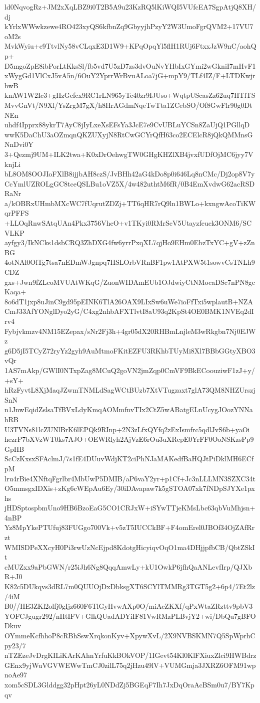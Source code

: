 ld0NqvogRz+JM2xXqLBZ9i0T2B5A9u23KzRQ5lKiWQI5VUfcEA7SgpAtjQ8XH/dj
kYrlxWWwkzewe4RO423xyQS6kfbnZq9GbyyjhPzyY2W3UmoFgrQVM2+17VU7oM2s
MvkWyiu+c9TtvlNy58vCLqxE3D1W9+KPqOpqYl5flH1RUj6FtxxJzW9nC/aohQp+
D5mgoZpE8ibPorLtKksSl/fb5vd7U5zD7zs3dvOuNvYHbIxGYmi2wGkniI7mHvF1
xWygGd1VlCxJ5vA5n/6OuY2YprrWrBvuALoa7jG+mpY9/TLf4IZ/F+LTDKwjrbwB
knAW1W2Ic3+gHzGcfcx9RC1rLN965yTc40zr9IJUso+WqtpUScasZz62uq7HTlTS
MvvGnVt/N9Xl/YsZrgM7gX/h8HrAGdmNqeTwTta1ZCebSO/Of8GwFlr90g0DtNEn
uhdf4Ipprx88ykrT7AyC8jIyLxeXsEFsYa3JcE7e9CvUBLuYCSn8ZaUjQ1PGllqD
wwK5DaChU3aOZmqnQKZUXyjN8RtCwGCYrQfH63co2ECElcR8jQkQMMnsGNnDvi0Y
3+Qezmj9UM+ILK2twa+K0xDrOehwgTW0GHgKHZlXB4jvxfUDfOjMC6jyy7VknjLi
bL8OM8OOJIoFXlB8ijjbAH8czS/JvBHh42aG4kDo8p0i646Lq8nCMc/Dj2op8V7y
CcYmlUZROLgGC8tceQSLBu1oVZ5X/4w482uthtM6fR/0B4EmXvdwG62acRSDRaNr
a/kOBRxUHmbMXcWC7fUqrutZDZj+TT6qHR7rQ9ln1BWLo+kxngwAcoTiKWqrPFFS
+LLOqRnwSAtqUAn4Pkx3756VhcO+v1TKyi0RMrScV5Utayzfeuck3ONM6/SCVLKP
ayfgy3/IkNCks1dsbCRQ3ZhDXG4fw6yrrPxqXL7qjHo9EHm0EbzTxYC+gV+zZnBG
4otNAl0OlTg7tsa7nEDmWJgnpq7HSLOrbVRnBF1pw1AtPXW5t1sowvCsTNLh9CDZ
gxs+Jwn9fZLcoMVUAtWKqG/ZuonWIDAmEUb1OJdwiyCtNMocaDSc7nPN8gcKaqa+
8o6dT1jxp8uJinC9gd95pEINK6TlA26OAX9LIxSw6uWe7ioFfTxi5wplautB+NZA
CmJ33AfYONglDyo2yG/C4xg2nhbAFXTlvtI8aU93q2KpSt4OE0BMK1NVEq2dIrv4
Fybjvkmzv4NM15EZepax/sNr2Fj3h+4gr05dX20RHBmLnjleM3wRkgbn7Nj0EJWz
g6D5jI5TCyZ72ryYz2gyh9AuMtmoFKitEZFU3RKhbTUyMi8Xl7BBbGGtyXBO3vQr
1AS7mAkp/GWlI0NTxpZag8MCuQ2goVN2jmZqp0CmVF9BkECoouziwF1zJ+y/+sY+
hRzFyvtL8XjMaqJZwmTNMLdSagWCtBUzb7XtVTugzaxt7glA73QM8NHZUrszjSnN
n1JnwEqidZslsaTfBVxLdyKmqAOMmfnvTIx2CtZ5wABatgELnUcygJOozYNNahRB
U3TVNs81lcZUNlBrK6lEPQk9RInp+2N3zLfxQYfq2zExIsmfrc5qdlJvS6b+yaOi
hezrP7bXVzWT0ks7AJO+OEWRlyh2AjVzE6rOu3uXRcpE0YrFF0OoNSKzsPp9GpHB
ScCzKxsxSFAclmJ/7s1fE4DUuvWdjKT2ciPhNJaMAKedfBaHQJtPiDklMH6ECfpM
lru4rBie4XNftqFgrlbr4MbUwP5DMIB/aP6vaY2yr+p1Cf+Jc3nLLLMN3SZXC34t
O5mmsgxIDXis+zKg6cWEpAu6Ey/30iDAvapaw7k5gSTOA07xk7fNDpSJYXe1pxhs
jHDSptospbmUno9HB6BzoEaG5CO1CRJxW+iSYwTTjeKMsLbc63qbVuMhjsn+4nBP
Yz8MpYkePTUfuj83FUGgo700Vk+v5zT5IUCCkBF+F4omErel0JBOf34OjZAfRrzt
WMISDPeXXcyH0Pi3rwUzNcEjpd8KdotgHicyiqvOqO1ma4DHjjpfbCB/QbtZSkIt
cMUZxx9aPbGWN/r25iJh6Ng8QqqAmwLy+kU1OwkP6jfhQaANLevfIrp/QJXbR+J0
K82c5DUkqvs3dRL7m0QUUOjDxDbksgXT6SCYlTMMRg3TGT5g2+6p4/7Et2lz/4iM
B0//HE3ZKl2olfj0gIjz660F6TlGyHvwAXp0O/miAcZKXf/qPxWtaZRzttv9pbV3
YOFCJgugr292/nHtIFV+GlkQUadADYiIF81VwRMzPLBvjY2+wi/DbQu7gBFODkuv
OYmmeKcfhhoP8cRBhSswXrqkonKyv+XpywXvL/2X9NVBSKMN7Q5SpWprhCpy23/7
nTZEzeJvDrgKILiKArKAhnYrfuKkBOkVOP/1IGevt54Kl0KlFXiuxZlci9HWBdrz
GEnx9yjWuVGVWEWwTmCJ0zilL75q2jHzu49lV+VUMGmja3JXRZ6OFM91wpnoAe97
xom5cSDL3Glddgg32pHpt26yL0NDdZj5BGEqF7Ih7JxDqOraAcBSm0u7/BY7Kpqv
